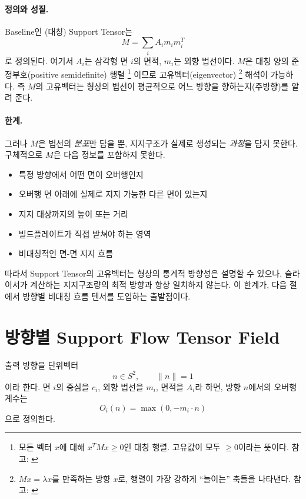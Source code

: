 \documentclass[11pt,a4paper]{article}
\begin{document}
\paragraph{정의와 성질.}
Baseline인 (대칭) Support Tensor는
\begin{equation}
M
=
\sum_i
A_i m_i m_i^T
\end{equation}
로 정의된다.
여기서 $A_i$는 삼각형 면 $i$의 면적, $m_i$는 외향 법선이다.
$M$은 대칭 양의 준정부호(positive semidefinite) 행렬%
\footnote{모든 벡터 $x$에 대해 $x^TMx\ge0$인 대칭 행렬. 고유값이 모두 $\ge0$이라는 뜻이다.
참고: \cite{hornjohnson}}
이므로 고유벡터(eigenvector)%
\footnote{$Mx=\lambda x$를 만족하는 방향 $x$로, 행렬이 가장 강하게 ``늘이는'' 축들을 나타낸다.
참고: \cite{golubvanloan}}
해석이 가능하다.
즉 $M$의 고유벡터는 형상의 법선이 평균적으로 어느 방향을 향하는지(주방향)를 알려 준다.

\paragraph{한계.}
그러나 $M$은 법선의 \emph{분포}만 담을 뿐, 지지구조가 실제로 생성되는 \emph{과정}을 담지 못한다.
구체적으로 $M$은 다음 정보를 포함하지 못한다.

\begin{itemize}
\item 특정 방향에서 어떤 면이 오버행인지
\item 오버행 면 아래에 실제로 지지 가능한 다른 면이 있는지
\item 지지 대상까지의 높이 또는 거리
\item 빌드플레이트가 직접 받쳐야 하는 영역
\item 비대칭적인 면-면 지지 흐름
\end{itemize}

따라서 Support Tensor의 고유벡터는 형상의 통계적 방향성은 설명할 수 있으나,
슬라이서가 계산하는 지지구조량의 최적 방향과 항상 일치하지 않는다.
이 한계가, 다음 절에서 방향별 비대칭 흐름 텐서를 도입하는 출발점이다.

\section{방향별 Support Flow Tensor Field}
\label{sec:sftf}

출력 방향을 단위벡터
\begin{equation}
n\in S^2, \qquad \|n\|=1
\end{equation}
이라 한다.
면 $i$의 중심을 $c_i$, 외향 법선을 $m_i$, 면적을 $A_i$라 하면,
방향 $n$에서의 오버행 계수는
\begin{equation}
O_i(n)=\max(0,-m_i\cdot n)
\end{equation}
으로 정의한다.
\end{document}
